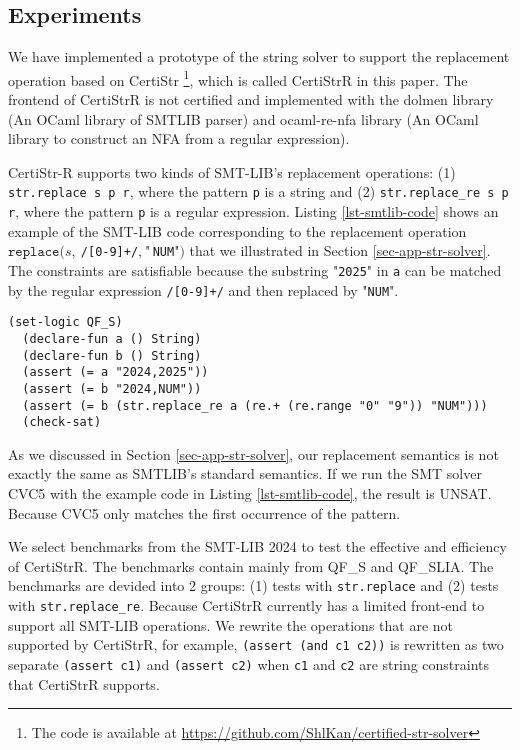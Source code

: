 \documentclass[a4paper,UKenglish,cleveref, autoref, anonymous, thm-restate]{lipics-v2021}
\begin{document}
\subsection{Experiments}

We have implemented a prototype of the string solver to support the replacement operation based on CertiStr \cite{cpp/KanLRS22} \footnote{The code is available at \url{https://github.com/ShlKan/certified-str-solver}}, which is called CertiStrR in this paper.
The frontend of CertiStrR is not certified and implemented with the dolmen \cite{dolmen} library (An OCaml library of SMTLIB parser) and ocaml-re-nfa \cite{ocaml-re-nfa} library (An OCaml library to construct an NFA from a regular expression).

%
CertiStr-R supports two kinds of SMT-LIB's replacement operations: (1) \texttt{str.replace s p r}, where the pattern \texttt{p} is a string and (2) \texttt{str.replace\_re s p r}, where the pattern \texttt{p} is a regular expression. Listing \ref{lst-smtlib-code} shows an example of the SMT-LIB code corresponding to the replacement operation $\texttt{replace}(s,~$\texttt{/[0-9]+/}$,~\text{"}$\texttt{NUM}$\text{"})$ that we illustrated in Section \ref{sec-app-str-solver}. The constraints are satisfiable because the 
substring "\texttt{2025}" in \texttt{a} can be matched by the regular expression \texttt{/[0-9]+/} and then replaced by "\texttt{NUM}".


\begin{lstlisting}[language=SMTLIB, caption={Example SMT-LIB Code}, label={lst-smtlib-code}]
  (set-logic QF_S)
  (declare-fun a () String)
  (declare-fun b () String)
  (assert (= a "2024,2025"))
  (assert (= b "2024,NUM"))
  (assert (= b (str.replace_re a (re.+ (re.range "0" "9")) "NUM")))
  (check-sat)
  \end{lstlisting}

  As we discussed in Section \ref{sec-app-str-solver}, our replacement semantics is not exactly the same as SMTLIB's standard semantics.
If we run the SMT solver CVC5 \cite{cvc5} with the example code in Listing \ref{lst-smtlib-code}, the result is UNSAT. Because CVC5 only matches the first occurrence of the pattern.


We select benchmarks from the SMT-LIB 2024 \cite{smtlib_benchmarks} to test the effective and efficiency of CertiStrR. The benchmarks contain mainly from QF\_S and QF\_SLIA. The benchmarks are devided into 2 groups: (1) tests with \texttt{str.replace} and (2) tests with \texttt{str.replace\_re}. Because CertiStrR currently has a limited front-end to support all SMT-LIB operations. We rewrite the operations that are not supported by CertiStrR, for example, \texttt{(assert (and c1 c2))} is rewritten as two separate \texttt{(assert c1)} and \texttt{(assert c2)} when \texttt{c1} and \texttt{c2} are string constraints that CertiStrR supports. 
\end{document}
